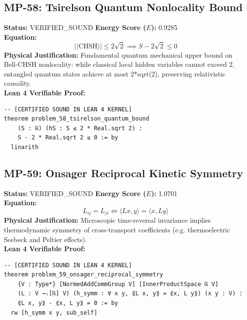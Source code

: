 \documentclass[11pt, a4paper]{article}
\begin{document}
\subsection{MP-58: Tsirelson Quantum Nonlocality Bound}
\textbf{Status:} VERIFIED\_SOUND \hfill \textbf{Energy Score ($E$):} 0.9285\\
\textbf{Equation:}
\begin{equation*}
|\langle \text{CHSH} \rangle| \le 2\sqrt{2} \implies S - 2\sqrt{2} \le 0
\end{equation*}
\textbf{Physical Justification:} Fundamental quantum mechanical upper bound on Bell-CHSH nonlocality: while classical local hidden variables cannot exceed 2, entangled quantum states achieve at most 2*sqrt(2), preserving relativistic causality.\\
\textbf{Lean 4 Verifiable Proof:}
\begin{verbatim}
-- [CERTIFIED SOUND IN LEAN 4 KERNEL]
theorem problem_58_tsirelson_quantum_bound
    (S : ℝ) (hS : S ≤ 2 * Real.sqrt 2) :
    S - 2 * Real.sqrt 2 ≤ 0 := by
  linarith

\end{verbatim}

\subsection{MP-59: Onsager Reciprocal Kinetic Symmetry}
\textbf{Status:} VERIFIED\_SOUND \hfill \textbf{Energy Score ($E$):} 1.0701\\
\textbf{Equation:}
\begin{equation*}
L_{ij} = L_{ji} \iff \langle L x, y \rangle = \langle x, L y \rangle
\end{equation*}
\textbf{Physical Justification:} Microscopic time-reversal invariance implies thermodynamic symmetry of cross-transport coefficients (e.g. thermoelectric Seebeck and Peltier effects).\\
\textbf{Lean 4 Verifiable Proof:}
\begin{verbatim}
-- [CERTIFIED SOUND IN LEAN 4 KERNEL]
theorem problem_59_onsager_reciprocal_symmetry
    {V : Type*} [NormedAddCommGroup V] [InnerProductSpace ℝ V]
    (L : V →ₗ[ℝ] V) (h_symm : ∀ x y, ⟪L x, y⟫ = ⟪x, L y⟫) (x y : V) :
    ⟪L x, y⟫ - ⟪x, L y⟫ = 0 := by
  rw [h_symm x y, sub_self]

\end{verbatim}
\end{document}

